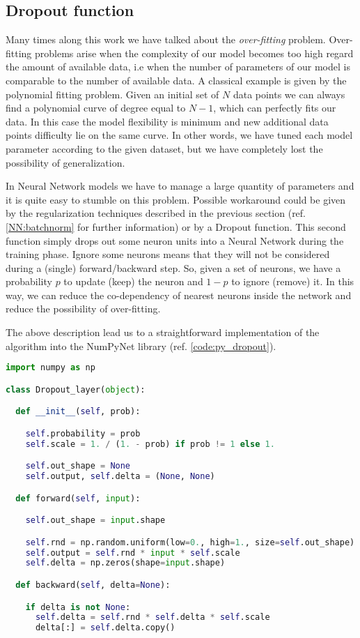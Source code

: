 \documentclass{standalone}
\begin{document}
\subsection[Dropout function]{Dropout function}\label{NN:dropout}

Many times along this work we have talked about the \emph{over-fitting} problem.
Over-fitting problems arise when the complexity of our model becomes too high regard the amount of available data, i.e when the number of parameters of our model is comparable to the number of available data.
A classical example is given by the polynomial fitting problem.
Given an initial set of $N$ data points we can always find a polynomial curve of degree equal to $N-1$, which can perfectly fits our data.
In this case the model flexibility is minimum and new additional data points difficulty lie on the same curve.
In other words, we have tuned each model parameter according to the given dataset, but we have completely lost the possibility of generalization.

In Neural Network models we have to manage a large quantity of parameters and it is quite easy to stumble on this problem.
Possible workaround could be given by the regularization techniques described in the previous section (ref. \ref{NN:batchnorm} for further information) or by a Dropout function.
This second function simply drops out some neuron units into a Neural Network during the training phase.
Ignore some neurons means that they will not be considered during a (single) forward/backward step.
So, given a set of neurons, we have a probability $p$ to update (keep) the neuron and $1-p$ to ignore (remove) it.
In this way, we can reduce the co-dependency of nearest neurons inside the network and reduce the possibility of over-fitting.

The above description lead us to a straightforward implementation of the algorithm into the \textsf{NumPyNet} library (ref. \ref{code:py_dropout}).

\lstset{style=snippet}
\begin{lstlisting}[language=Python, caption=NumPyNet version of Dropout function, label=code:py_dropout]
import numpy as np

class Dropout_layer(object):

  def __init__(self, prob):

    self.probability = prob
    self.scale = 1. / (1. - prob) if prob != 1 else 1.

    self.out_shape = None
    self.output, self.delta = (None, None)

  def forward(self, input):

    self.out_shape = input.shape

    self.rnd = np.random.uniform(low=0., high=1., size=self.out_shape) < self.probability
    self.output = self.rnd * input * self.scale
    self.delta = np.zeros(shape=input.shape)

  def backward(self, delta=None):

    if delta is not None:
      self.delta = self.rnd * self.delta * self.scale
      delta[:] = self.delta.copy()

\end{lstlisting}
\end{document}

